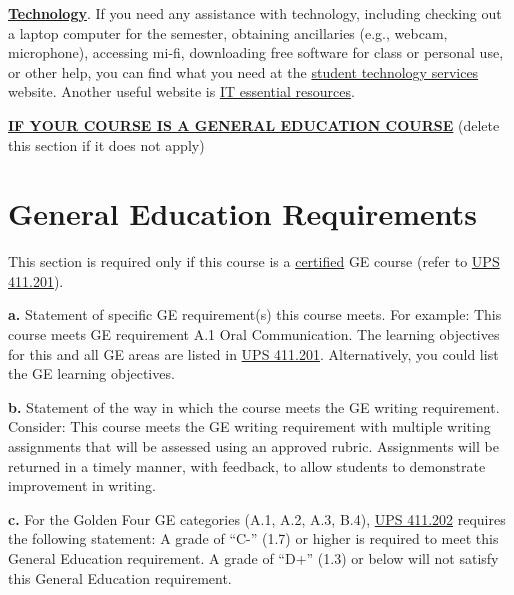 \documentclass[12pt]{article}
\begin{document}
\textbf{\uline{Technology}}. {\color{suggestionred}If you need any assistance with technology, including checking out a laptop computer for the semester, obtaining ancillaries (e.g., webcam, microphone), accessing mi-fi, downloading free software for class or personal use, or other help, you can find what you need at the \href{https://www.fullerton.edu/IT/students/}{student technology services} website. Another useful website is \href{http://www.fullerton.edu/it/essential-resources/}{IT essential resources}.}

\textbf{\uline{IF YOUR COURSE IS A GENERAL EDUCATION COURSE}} {\color{annotationblue}(delete this section if it does not apply)}

\section{General Education Requirements}

{\color{annotationblue}This section is required only if this course is a \uline{certified} GE course (refer to \href{https://www.fullerton.edu/senate/publications_policies_resolutions/ups/UPS\%20400/UPS\%20411.201.pdf}{UPS 411.201}).}

\textbf{a.} {\color{annotationblue}Statement of specific GE requirement(s) this course meets.} {\color{suggestionred}For example: This course meets GE requirement A.1 Oral Communication. The learning objectives for this and all GE areas are listed in \href{https://www.fullerton.edu/senate/publications_policies_resolutions/ups/UPS\%20400/UPS\%20411.201.pdf}{UPS 411.201}. Alternatively, you could list the GE learning objectives.}

\textbf{b.} {\color{annotationblue}Statement of the way in which the course meets the GE writing requirement.} {\color{suggestionred}Consider: This course meets the GE writing requirement with multiple writing assignments that will be assessed using an approved rubric. Assignments will be returned in a timely manner, with feedback, to allow students to demonstrate improvement in writing.}

\textbf{c.} {\color{annotationblue}For the Golden Four GE categories (A.1, A.2, A.3, B.4), \href{https://www.fullerton.edu/senate/publications_policies_resolutions/ups/UPS\%20400/UPS\%20411.202.pdf}{UPS 411.202} requires the following statement:} A grade of ``C-'' (1.7) or higher is required to meet this General Education requirement. A grade of ``D+'' (1.3) or below will not satisfy this General Education requirement.
\end{document}
